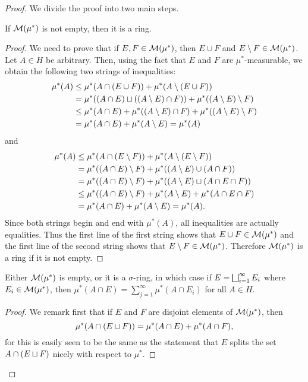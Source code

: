 \begin{proof}

We divide the proof into two main steps.

\begin{lemma}
If ${\cal M}(\mu^*)$ is not empty, then it is a ring.
\end{lemma}
\begin{proof}
We need to prove that if $E,F\in{\cal M}(\mu^*)$, then $E\cup F$ and $E\setminus F\in{\cal M}(\mu^*)$. Let $A\in H$ be arbitrary. Then, using the fact that $E$ and $F$ are $\mu^*$-measurable, we obtain the following two strings of inequalities:
\begin{align*}
    \mu^*(A)&\leq\mu^*(A\cap(E\cup F))+\mu^*(A\setminus(E\cup F)) \\
            &=\mu^*((A\cap E)\sqcup((A\setminus E)\cap F))+\mu^*((A\setminus E)\setminus F) \\
            &\leq\mu^*(A\cap E)+\mu^*((A\setminus E)\cap F)+\mu^*((A\setminus E)\setminus F) \\
            &=\mu^*(A\cap E)+\mu^*(A\setminus E)=\mu^*(A)
\end{align*}
and
\begin{align*}
    \mu^*(A)&\leq\mu^*(A\cap(E\setminus F))+\mu^*(A\setminus (E\setminus F)) \\
            &=\mu^*((A\cap E)\setminus F)+\mu^*((A\setminus E)\cup(A\cap F)) \\
            &=\mu^*((A\cap E)\setminus F)+\mu^*((A\setminus E)\sqcup(A\cap E\cap F)) \\
            &\leq\mu^*((A\cap E)\setminus F)+\mu^*(A\setminus E)+\mu^*(A\cap E\cap F) \\
            &=\mu^*(A\cap E)+\mu^*(A\setminus E)=\mu^*(A) .
\end{align*}
Since both strings begin and end with $\mu^*(A)$, all inequalities are actually equalities. Thus the first line of the first string shows that $E\cup F\in{\cal M}(\mu^*)$ and the first line of the second string shows that $E\setminus F\in{\cal M}(\mu^*)$. Therefore ${\cal M}(\mu^*)$ is a ring if it is not empty.
\end{proof}

\begin{lemma}\label{lem:outer measure sigma additivity}
Either ${\cal M}(\mu^*)$ is empty, or it is a $\sigma$-ring, in which case if $E=\bigsqcup_{i=1}^\infty E_i$ where $E_i\in{\cal M}(\mu^*)$, then $\mu^*(A\cap E)=\sum_{j=1}^\infty\mu^*(A\cap E_i)$ for all $A\in H$.
\end{lemma}
\begin{proof}
We remark first that if $E$ and $F$ are disjoint elements of ${\cal M}(\mu^*)$, then \[\mu^*(A\cap(E\sqcup F))=\mu^*(A\cap E)+\mu^*(A\cap F),\] for this is easily seen to be the same as the statement that $E$ splits the set $A\cap(E\sqcup F)$ nicely with respect to $\mu^*$.


\end{proof}
\end{proof}
